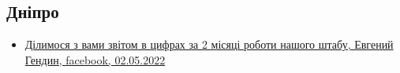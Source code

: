  
 
 
 
 

\subsection{Дніпро}
\label{sec:topics.vojna.cities.dnepr}

\begin{itemize} %

\item \hyperlink{02_05_2022.fb.gendin_evgenij.dnepropetrovsk.1.zvit}{%
Ділимося з вами звітом в цифрах за 2 місяці роботи нашого штабу, Евгений Гендин, facebook, 02.05.2022%
}

\end{itemize} %
